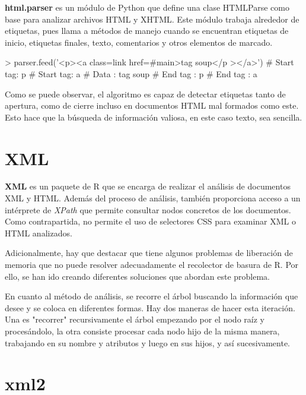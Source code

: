 \textbf{html.parser} \cite{html-parser} es un módulo de Python que define una clase HTMLParse como base 
para analizar archivos HTML y XHTML. Este módulo trabaja alrededor de etiquetas, pues llama a métodos de 
manejo cuando se encuentran etiquetas de inicio, etiquetas finales, texto, comentarios y otros elementos 
de marcado.

\begin{Schunk}
    \begin{Soutput}
        > parser.feed('<p><a class=link href=#main>tag soup</p ></a>')
        # Start tag: p
        # Start tag: a
        # Data     : tag soup
        # End tag  : p
        # End tag  : a
    \end{Soutput}
\end{Schunk}

Como se puede observar, el algoritmo es capaz de detectar etiquetas tanto de apertura, como de cierre incluso
en documentos HTML mal formados como este. Esto hace que la búsqueda de información valiosa, en este caso
texto, sea sencilla.

\section{XML}
\label{sec:xml}

\textbf{XML} \cite{xml-cran} es un paquete de R que se encarga de realizar el análisis de documentos XML
y HTML. Además del proceso de análisis, también proporciona acceso a un intérprete de \emph{XPath} que 
permite consultar nodos concretos de los documentos. Como contrapartida, no permite el uso de selectores 
CSS para examinar XML o HTML analizados.

Adicionalmente, hay que destacar que tiene algunos problemas de liberación de memoria que no puede resolver
adecuadamente el recolector de basura de R. Por ello, se han ido creando diferentes soluciones que abordan
este problema.

En cuanto al método de análisis, se recorre el árbol buscando la información que desee y se coloca en 
diferentes formas. Hay dos maneras de hacer esta iteración. Una es "recorrer" recursivamente el árbol 
empezando por el nodo raíz y procesándolo, la otra consiste procesar cada nodo hijo de la misma manera, 
trabajando en su nombre y atributos y luego en sus hijos, y así sucesivamente.


\section{xml2}
\label{sec:xml2}

